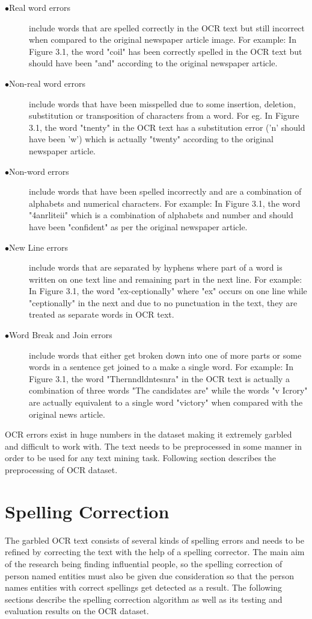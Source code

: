 \documentclass[letterpaper,11pt]{report}
\begin{document}
\begin{description}
 \item[$\bullet$Real word errors] include words that are spelled correctly in the OCR text but still incorrect when compared to the original newspaper article image. For example: In Figure 3.1, the word "coil"  has been correctly spelled in the OCR text  but should have been "and" according to the original newspaper article. 
 \item[$\bullet$Non-real word errors] include words that have been misspelled due to some insertion, deletion, substitution or transposition of characters from a word. For eg. In Figure 3.1, the word "tnenty" in the OCR text has a substitution error ('n' should have been 'w') which is actually "twenty" according to the original newspaper article.
 \item[$\bullet$Non-word errors] include words that have been spelled incorrectly and are a combination of alphabets and numerical characters. For example: In Figure 3.1, the word "4anrliteii" which is a combination of alphabets and number and should have been "confident" as per the original newspaper article.
\item[$\bullet$New Line errors] include words that are separated by hyphens where part of a word is written on one text line and remaining part in the next line. For example: In Figure 3.1, the word "ex-ceptionally" where "ex" occurs on one line while "ceptionally" in the next and due to no punctuation in the text, they are treated as separate words in OCR text.
\item[$\bullet$Word Break and Join errors] include words that either get broken down into one of more parts or some words in a sentence get joined to a make a single word. For example: In Figure 3.1, the word "Thernndldntesnra" in the OCR text is actually a combination of three words "The candidates are" while the words "v Icrory" are actually equivalent to a single word "victory" when compared with the original news article.
\end{description} 

OCR errors exist in huge numbers in the dataset making it extremely garbled and difficult to work with. The text needs to be preprocessed in some manner in order to be used for any text mining task. Following section describes the preprocessing of OCR dataset.

\section{Spelling Correction}
 The garbled OCR text consists of several kinds of spelling errors and needs to be refined by correcting the text with the help of a spelling corrector. The main aim of the research being finding influential people, so the spelling correction of person named entities must also be given due consideration so that the person names entities with correct spellings get detected as a result.
The following sections describe the spelling correction algorithm as well as its testing and evaluation results on the OCR dataset.
\end{document}
